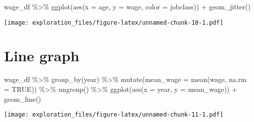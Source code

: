 \documentclass[
]{book}
\newenvironment{Shaded}{\begin{snugshade}}{\end{snugshade}}
\newcommand{\AttributeTok}[1]{\textcolor[rgb]{0.77,0.63,0.00}{#1}}
\newcommand{\ConstantTok}[1]{\textcolor[rgb]{0.00,0.00,0.00}{#1}}
\newcommand{\FunctionTok}[1]{\textcolor[rgb]{0.00,0.00,0.00}{#1}}
\newcommand{\NormalTok}[1]{#1}
\newcommand{\SpecialCharTok}[1]{\textcolor[rgb]{0.00,0.00,0.00}{#1}}
\begin{document}
\begin{Shaded}
\begin{Highlighting}[]
\NormalTok{wage\_df }\SpecialCharTok{\%\textgreater{}\%} 
  \FunctionTok{ggplot}\NormalTok{(}\FunctionTok{aes}\NormalTok{(}\AttributeTok{x =}\NormalTok{ age, }\AttributeTok{y =}\NormalTok{ wage, }\AttributeTok{color =}\NormalTok{ jobclass)) }\SpecialCharTok{+}
  \FunctionTok{geom\_jitter}\NormalTok{()}
\end{Highlighting}
\end{Shaded}

\texttt{[image: exploration\_files/figure-latex/unnamed-chunk-10-1.pdf]}

\hypertarget{line}{%
\chapter{Line graph}\label{line}}

\begin{Shaded}
\begin{Highlighting}[]
\NormalTok{wage\_df }\SpecialCharTok{\%\textgreater{}\%}  
  \FunctionTok{group\_by}\NormalTok{(year) }\SpecialCharTok{\%\textgreater{}\%}  
  \FunctionTok{mutate}\NormalTok{(}\AttributeTok{mean\_wage =} \FunctionTok{mean}\NormalTok{(wage, }\AttributeTok{na.rm =} \ConstantTok{TRUE}\NormalTok{)) }\SpecialCharTok{\%\textgreater{}\%}  
  \FunctionTok{ungroup}\NormalTok{() }\SpecialCharTok{\%\textgreater{}\%} 
  \FunctionTok{ggplot}\NormalTok{(}\FunctionTok{aes}\NormalTok{(}\AttributeTok{x =}\NormalTok{ year, }\AttributeTok{y =}\NormalTok{ mean\_wage)) }\SpecialCharTok{+} 
  \FunctionTok{geom\_line}\NormalTok{() }
\end{Highlighting}
\end{Shaded}

\texttt{[image: exploration\_files/figure-latex/unnamed-chunk-11-1.pdf]}

  
\end{document}

